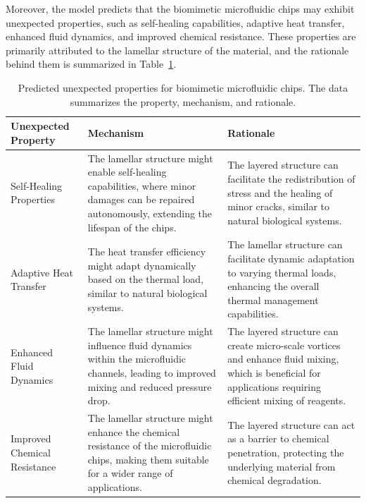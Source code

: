 \documentclass{article}
\begin{document}
Moreover, the model predicts that the biomimetic microfluidic chips may exhibit unexpected properties, such as self-healing capabilities, adaptive heat transfer, enhanced fluid dynamics, and improved chemical resistance. These properties are primarily attributed to the lamellar structure of the material, and the rationale behind them is summarized in Table~\ref{tbl:heat_unexpected_properties}.

\begin{table}[th!]
 \centering
\caption{Predicted unexpected properties for biomimetic microfluidic chips. The data summarizes the property, mechanism, and rationale. }
\begin{tabularx}{1.0\textwidth}{XXX}
\toprule
 \textbf{Unexpected Property} & \textbf{Mechanism} & \textbf{Rationale}
\tabularnewline
\midrule
Self-Healing Properties & The lamellar structure might enable self-healing capabilities, where minor damages can be repaired autonomously, extending the lifespan of the chips. & The layered structure can facilitate the redistribution of stress and the healing of minor cracks, similar to natural biological systems.
\tabularnewline
\midrule
Adaptive Heat Transfer
& The heat transfer efficiency might adapt dynamically based on the thermal load, similar to natural biological systems.
& The lamellar structure can facilitate dynamic adaptation to varying thermal loads, enhancing the overall thermal management capabilities.
\tabularnewline
\midrule
Enhanced Fluid Dynamics &
The lamellar structure might influence fluid dynamics within the microfluidic channels, leading to improved mixing and reduced pressure drop.& The layered structure can create micro-scale vortices and enhance fluid mixing, which is beneficial for applications requiring efficient mixing of reagents.
\tabularnewline
\midrule
Improved Chemical Resistance
& The lamellar structure might enhance the chemical resistance of the microfluidic chips, making them suitable for a wider range of applications.
& The layered structure can act as a barrier to chemical penetration, protecting the underlying material from chemical degradation.
\tabularnewline
\bottomrule
\end{tabularx}
\label{tbl:heat_unexpected_properties}
\end{table}
\end{document}
